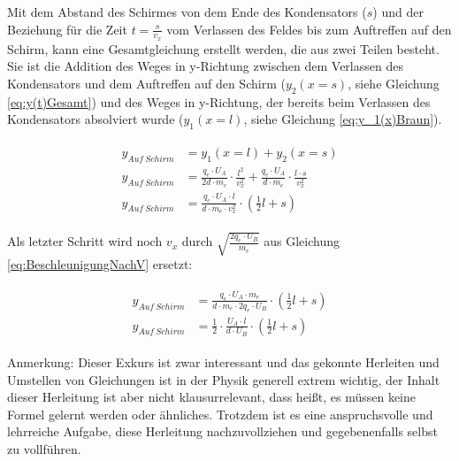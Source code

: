 \noindent Mit dem Abstand des Schirmes von dem Ende des Kondensators ($s$) und der Beziehung für die Zeit $t=\frac{s}{v_x}$ vom Verlassen des Feldes bis zum Auftreffen auf den Schirm, kann eine Gesamtgleichung erstellt werden, die aus zwei Teilen besteht. Sie ist die Addition des Weges in y-Richtung zwischen dem Verlassen des Kondensators und dem Auftreffen auf den Schirm ($y_2(x=s)$, siehe Gleichung \ref{eq:y(t)Gesamt}) und des Weges in y-Richtung, der bereits beim Verlassen des Kondensators absolviert wurde ($y_1(x=l)$, siehe Gleichung \ref{eq:y_1(x)Braun}).

\begin{align} \label{eq:yGesamtAnsatz}
\begin{split}
	y_{Auf \ Schirm} &= y_1(x=l) + y_2(x=s) \\
	y_{Auf \ Schirm} &= \frac{q_e \cdot U_A}{2d \cdot m_e} \cdot \frac{l^2}{v_{x}^2}
				      + \frac{q_e \cdot U_A}{d \cdot m_e} \cdot \frac{l \cdot s}{v_{x}^2} \\
	y_{Auf \ Schirm} &= \frac{q_e \cdot U_A \cdot l}{d \cdot m_e \cdot v_{x}^2} \cdot (\frac{1}{2}l + s)
\end{split}
\end{align}

Als letzter Schritt wird noch $v_{x}$ durch $\sqrt{\frac{2 q_e \cdot U_B}{m_e}}$ aus Gleichung \ref{eq:BeschleunigungNachV} ersetzt:

\begin{align} \label{eq:yGesamt}
\begin{split}
	y_{Auf \ Schirm} &= \frac{q_e \cdot U_A \cdot m_e}{d \cdot m_e \cdot 2 q_e \cdot U_B} \cdot (\frac{1}{2}l + s) \\
	y_{Auf \ Schirm} &= \frac{1}{2} \cdot \frac{U_A \cdot l}{d \cdot U_B} \cdot (\frac{1}{2}l + s)
\end{split}
\end{align}

\begin{leftbar}
Anmerkung: Dieser Exkurs ist zwar interessant und das gekonnte Herleiten und Umstellen von Gleichungen ist in der Physik generell extrem wichtig, der Inhalt dieser Herleitung ist aber nicht klausurrelevant, dass heißt, es müssen keine Formel gelernt werden oder ähnliches. Trotzdem ist es eine anspruchsvolle und lehrreiche Aufgabe, diese Herleitung nachzuvollziehen und gegebenenfalls selbst zu vollführen.
\end{leftbar}




